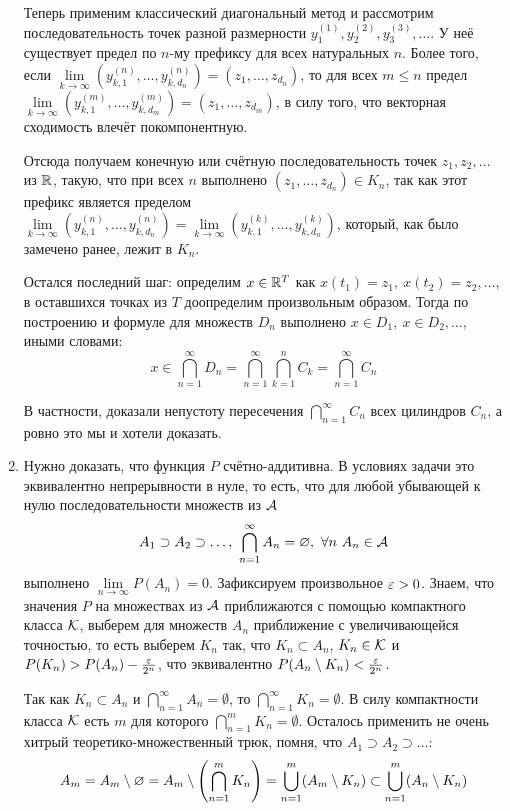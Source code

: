 \begin{solution}
\begin{enumerate}
        Теперь применим классический диагональный метод и рассмотрим последовательность точек разной размерности $y_1^{(1)}, y_2^{(2)}, y_3^{(3)}, \dots$. У неё существует предел по $n$-му префиксу для всех натуральных $n$. Более того, если $\lim\limits_{k \to \infty} (y_{k, 1}^{(n)}, \dots, y_{k, {d_n}}^{(n)}) = (z_1, \dots, z_{d_n})$, то для всех $m \le n$ предел $\lim\limits_{k \to \infty} (y_{k, 1}^{(m)}, \dots, y_{k, {d_m}}^{(m)}) = (z_1, \dots, z_{d_m})$, в силу того, что векторная сходимость влечёт покомпонентную.

        Отсюда получаем конечную или счётную последовательность точек $z_1, z_2, \dots$ из $\mathbb{R}$, такую, что при всех $n$ выполнено $(z_1, \dots, z_{d_n}) \in K_n$, так как этот префикс является пределом $\lim\limits_{k \to \infty} (y_{k, 1}^{(n)}, \dots, y_{k, {d_n}}^{(n)}) = \lim\limits_{k \to \infty} (y_{k, 1}^{(k)}, \dots, y_{k, {d_n}}^{(k)})$, который, как было замечено ранее, лежит в $K_n$.

        Остался последний шаг: определим $x \in \mathbb{R}^T$ как $x(t_1) = z_1,\ x(t_2) = z_2, \dots$, в оставшихся точках из $T$ доопределим произвольным образом. Тогда по построению и формуле для множеств $D_n$ выполнено $x \in D_1,\ x \in D_2, \dots$, иными словами:
        \[
            x \in \bigcap_{n=1}^\infty D_n = \bigcap_{n=1}^\infty \bigcap_{k=1}^n C_k = \bigcap_{n=1}^\infty C_n
        \]

        В частности, доказали непустоту пересечения $\bigcap_{n=1}^\infty C_n$ всех цилиндров $C_n$, а ровно это мы и хотели доказать.

        \item Нужно доказать, что функция $P$ счётно-аддитивна. В условиях задачи это эквивалентно непрерывности в нуле, то есть, что для любой убывающей к нулю последовательности множеств из $\mathcal{A}$
        \[
            A_1 \supset A_2 \supset \dots,\ \bigcap_{n=1}^\infty A_n = \emptyset,\ \forall n \ A_n \in \cA
        \]
        выполнено $\lim\limits_{n \to \infty} P(A_n) = 0$. Зафиксируем произвольное $\varepsilon > 0$. Знаем, что значения $P$ на множествах из $\mathcal{A}$ приближаются с помощью компактного класса $\mathcal{K}$, выберем для множеств $A_n$ приближение с увеличивающейся точностью, то есть выберем $K_n$ так, что $K_n \subset A_n$, $K_n \in \mathcal{K}$ и $P(K_n) > P(A_n) - \frac{\varepsilon}{2^n}$, что эквивалентно $P(A_n \setminus K_n) < \frac{\varepsilon}{2^n}$.

        Так как $K_n \subset A_n$ и $\bigcap_{n=1}^\infty A_n = \emptyset$, то $\bigcap_{n=1}^\infty K_n = \emptyset$. В силу компактности класса $\mathcal{K}$ есть $m$ для которого $\bigcap_{n=1}^m K_n = \emptyset$. Осталось применить не очень хитрый теоретико-множественный трюк, помня, что $A_1 \supset A_2 \supset \dots$:
        \[
            A_m = A_m \setminus \varnothing = A_m \setminus \left(\bigcap_{n=1}^m K_n\right) = \bigcup_{n=1}^m (A_m \setminus K_n) \subset \bigcup_{n=1}^m (A_n \setminus K_n)
        \]


\end{enumerate}
\end{solution}
